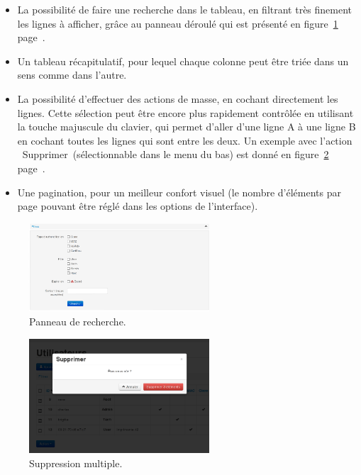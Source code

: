 \begin{itemize}
\item La possibilité de faire une recherche dans le tableau, en filtrant très finement les lignes à afficher, grâce au panneau déroulé qui est présenté en figure~\ref{filters} page~\pageref{filters}.
\item Un tableau récapitulatif, pour lequel chaque colonne peut être triée dans un sens comme dans l'autre.
\item La possibilité d'effectuer des actions de masse, en cochant directement les lignes. Cette sélection peut être encore plus rapidement contrôlée en utilisant la touche majuscule du clavier, qui permet d'aller d'une ligne A à une ligne B en cochant toutes les lignes qui sont entre les deux. Un exemple avec l'action \og~Supprimer~\fg (sélectionnable dans le menu du bas) est donné en figure~\ref{massdel} page~\pageref{massdel}.
\item Une pagination, pour un meilleur confort visuel (le nombre d'éléments par page pouvant être réglé dans les options de l'interface).
\end{itemize}

\begin{figure}[!h]
	\begin{center}
	    \includegraphics[width=0.6\textwidth]{img/filters.png}
	\end{center}
	\caption{Panneau de recherche.}
	\label{filters}
\end{figure}

\begin{figure}[!h]
	\begin{center}
	    \includegraphics[width=0.6\textwidth]{img/massdel.png}
	\end{center}
	\caption{Suppression multiple.}
	\label{massdel}
\end{figure}

